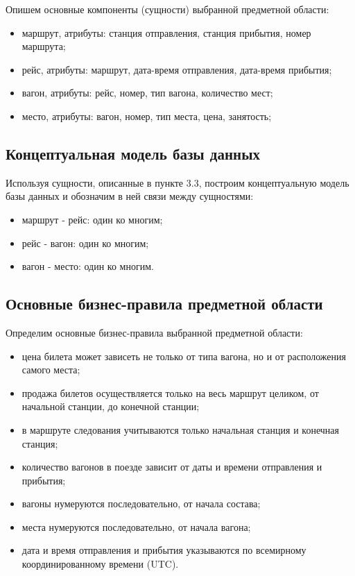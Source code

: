 Опишем основные компоненты (сущности) выбранной предметной области:

    \begin{itemize}
        \item маршрут, атрибуты: станция отправления, станция прибытия, номер маршрута;
        \item рейс, атрибуты: маршрут, дата-время отправления, дата-время прибытия;
        \item вагон, атрибуты: рейс, номер, тип вагона, количество мест;
        \item место, атрибуты: вагон, номер, тип места, цена, занятость;
    \end{itemize}

\vspace{0.8cm}

\subsection{Концептуальная модель базы данных}

Используя сущности, описанные в пункте 3.3, построим концептуальную модель базы данных и обозначим в ней связи между сущностями: 

    \begin{itemize}
        \item маршрут - рейс: один ко многим;
        \item рейс - вагон: один ко многим;
        \item вагон - место: один ко многим.
    \end{itemize}

\vspace{0.8cm}

\subsection{Основные бизнес-правила предметной области}

Определим основные бизнес-правила выбранной предметной области:

    \begin{itemize}
        \item цена билета может зависеть не только от типа вагона, но и от расположения самого места;
        \item продажа билетов осуществляется только на весь маршрут целиком, от начальной станции, до конечной станции;
        \item в маршруте следования учитываются только начальная станция и конечная станция;
        \item количество вагонов в поезде зависит от даты и времени отправления и прибытия;
        \item вагоны нумеруются последовательно, от начала состава;
        \item места нумеруются последовательно, от начала вагона;
        \item дата и время отправления и прибытия указываются по всемирному координированному времени (UTC).
    \end{itemize}
\clearpage